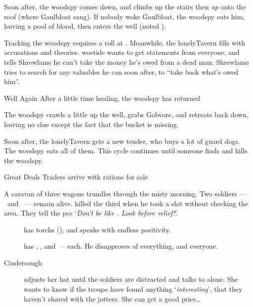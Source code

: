 \documentclass[10pt,twoside]{book}
\begin{document}
\setcounter{wounds}{3}
\woodspy

Soon after, the \gls{woodspy} comes down, and climbs up the stairs then \emph{up} onto the roof (where Gaulbloat sang).
If nobody woke Gaulbloat, the \gls{woodspy} eats him, leaving a pool of blood, then enters the well (noted ).

Tracking the \gls{woodspy} requires a  roll at \tn[10].
Meanwhile, the \gls{lonelyTavern} fills with accusations and theories.
\Gls{woetide} wants to get statements from everyone, and tells Shrewlame he can't take the money he's owed from a dead man.
Shrewlame tries to search for any valuables he can soon after, to ``take back what's owed him''.

{Well Again}%
{After a little time healing, the \gls{woodspy} has returned}%

The \gls{woodspy} crawls a little up the well, grabs Gobvore, and retreats back down, leaving no clue except the fact that the bucket is missing.

Soon after, the \gls{lonelyTavern} gets a new \gls{tender}, who buys a lot of guard dogs.
The \gls{woodspy} eats all of them.
This cycle continues until someone finds and kills the \gls{woodspy}.


{Great Deals}%
{Traders arrive with \glspl{ration} for sale}%

A caravan of three wagons trundles through the misty morning.
Two \glspl{soldier} --- \composeHumanName\ and \composeHumanName\ --- remain alive.
 killed the third when he took a shit without checking the area.
They tell the \glspl{pc} `\textit{Don't be like \composeHumanName.  Look before relief!}'.

\begin{description}
  \item[\composeHumanName]
  has \glspl{torch} (), and speaks with endless positivity.
  \item[\composeHumanName]
  has \rations, \rations, and \rations\ --  each.
  He disapproves of everything, and everyone.
  \item[Cindercough]
  adjusts her hat until the \glspl{soldier} are distracted and talks to  alone.
  She wants to know if the troupe have found anything `\emph{interesting}', that they haven't shared with the \glspl{jotter}.
  She can get a good price\ldots
\end{description}
\end{document}
